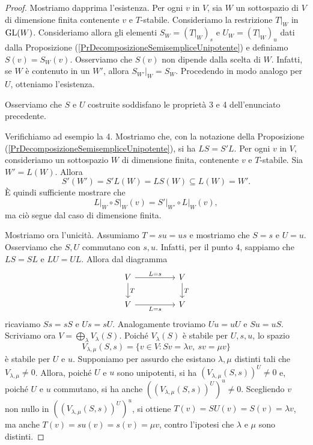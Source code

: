 \begin{proof}
Mostriamo dapprima l'esistenza. Per ogni $v$ in $V$, sia $W$ un sottospazio di $V$ di dimensione finita contenente $v$ e $T$-stabile. Consideriamo la restrizione $\left.T\right|_W$ in $\operatorname{GL}(W)$. Consideriamo allora gli elementi $S_W=(\left.T\right|_W)_s$ e $U_W=(\left.T\right|_W)_u$ dati dalla Proposizione (\ref{PrDecomposizioneSemisempliceUnipotente}) e definiamo $S(v)=S_W(v)$. Osserviamo che $S(v)$ non dipende dalla scelta di $W$. Infatti, se $W$ è contenuto in un $W'$, allora $\left.S_{W'}\right|_{W}=S_W$. Procedendo in modo analogo per $U$, otteniamo l'esistenza. 

Osserviamo che $S$ e $U$ costruite soddisfano le proprietà 3 e 4 dell'enunciato precedente. 
\begin{mdframed}[topline=false,rightline=false,bottomline=false]  
    Verifichiamo ad esempio la 4. Mostriamo che, con la notazione della Proposizione (\ref{PrDecomposizioneSemisempliceUnipotente}), si ha $LS=S'L$. Per ogni $v$ in $V$, consideriamo un sottospazio $W$ di dimensione finita, contenente $v$ e $T$-stabile. Sia $W'=L(W)$. Allora \[S'(W')=S'L(W)=LS(W)\subseteq L(W)=W'.\]
    È quindi sufficiente mostrare che \[\left.L\right|_{W}\circ \left.S\right|_{W} (v)=\left.S'\right|_{W'}\circ \left.L\right|_{W} (v),\] ma ciò segue dal caso di dimensione finita.
\end{mdframed}
Mostriamo ora l'unicità. Assumiamo $T=su=us$ e mostriamo che $S=s$ e $U=u$. Osserviamo che $S,U$ commutano con $s,u$. Infatti, per il punto 4, sappiamo che $LS=SL$ e $LU=UL$. Allora dal diagramma %
\[\begin{tikzcd}
	V && V \\
	V && V
	\arrow["{L=s}", from=1-1, to=1-3]
	\arrow["T", from=1-1, to=2-1]
	\arrow["T", from=1-3, to=2-3]
	\arrow["{L=s}"', from=2-1, to=2-3]
\end{tikzcd}\]
ricaviamo $Ss=sS$ e $Us=sU$. Analogamente troviamo $Uu=uU$ e $Su=uS$. Scriviamo ora $V=\bigoplus_\lambda V_\lambda(S)$. Poiché $V_\lambda(S)$ è stabile per $U,s,u$, lo spazio \[V_{\lambda,\mu}(S,s)=\{v\in V\colon Sv=\lambda v, \ sv=\mu v\}\] è stabile per $U$ e $u$. Supponiamo per assurdo che esistano $\lambda, \mu$ distinti tali che $V_{\lambda,\mu}\ne 0$. Allora, poiché $U$ e $u$ sono unipotenti, si ha $(V_{\lambda,\mu}(S,s))^U\ne 0$ e, poiché $U$ e $u$ commutano, si ha anche $((V_{\lambda,\mu}(S,s))^U)^u\ne 0$. Scegliendo $v$ non nullo in $((V_{\lambda,\mu}(S,s))^U)^u$, si ottiene $T(v)=SU(v)=S(v)=\lambda v$, ma anche $T(v)=su(v)=s(v)=\mu v$, contro l'ipotesi che $\lambda$ e $\mu$ sono distinti.
\end{proof}

